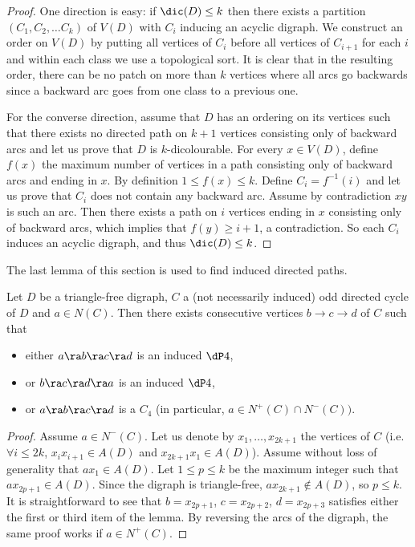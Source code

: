 \begin{proof}


One direction is easy: if $\dic(D)\leq k$ then there exists a partition $(C_1,C_2,\ldots C_k)$ of $V(D)$ with $C_i$ inducing an acyclic digraph. We construct an order on $V(D)$ by putting all vertices of $C_i$ before all vertices of $C_{i+1}$ for each $i$ and within each class we use a topological sort. It is clear that in the resulting order, there can be no patch on more than $k$ vertices where all  arcs go backwards since a backward arc goes from one class to a previous one.

For the converse direction, assume that $D$ has an ordering on its vertices such that there exists no directed path on $k+1$ vertices consisting only of backward arcs and let us prove that $D$ is $k$-dicolourable. 
For every $x \in V(D)$, define $f(x)$ the maximum number of vertices in a path consisting only of backward arcs and ending in $x$. By definition $1\leq f(x)\leq k$. Define $C_i=f^{-1}(i)$ and let us prove that $C_i$ does not contain any backward arc. Assume by contradiction $xy$ is such an arc. Then there exists a path on $i$ vertices ending in $x$ consisting only of backward arcs, which implies that $f(y)\geq i+1$, a contradiction. So each $C_i$ induces an acyclic digraph, and thus $\dic(D)\leq k$.
\end{proof}


The last lemma of this section is used to find induced directed paths. 


\begin{lemma}\label{lem:two_push}
Let $D$ be a triangle-free digraph, $C$ a (not necessarily induced) odd directed cycle of $D$ and $a \in N(C)$. Then there exists consecutive vertices $b\rightarrow c\rightarrow d$ of $C$ such that
\begin{itemize}
    \item either $a\ra b\ra c\ra d$ is an induced $\dP4$,
    \item or $b\ra c\ra d\ra a$  is an induced $\dP4$,
    \item or $a\ra b\ra c\ra d$ is a $C_4$ (in particular, $a\in N^{+}(C)\cap N^{-}(C)).$
\end{itemize}
\end{lemma}

\begin{proof} Assume $a\in N^-(C)$. Let us denote by $x_1,\ldots,x_{2k+1}$ the vertices of $C$ (i.e. $\forall i\leq 2k$, $x_ix_{i+1}\in A(D)$ and $x_{2k+1}x_1\in A(D)$). Assume without loss of generality that $ax_{1}\in A(D)$. 
Let $1 \leq p \leq k$ be the maximum integer such that $ax_{2p+1} \in A(D)$.
Since the digraph is triangle-free, $ax_{2k+1}\notin A(D)$, so $p \leq k$. 
 It is straightforward to see that $b=x_{2p+1}$, $c=x_{2p+2}$, $d=x_{2p+3}$  satisfies either the first or third item of the lemma. By reversing the arcs of the digraph, the same proof works if $a\in N^+(C)$. 
\end{proof}

